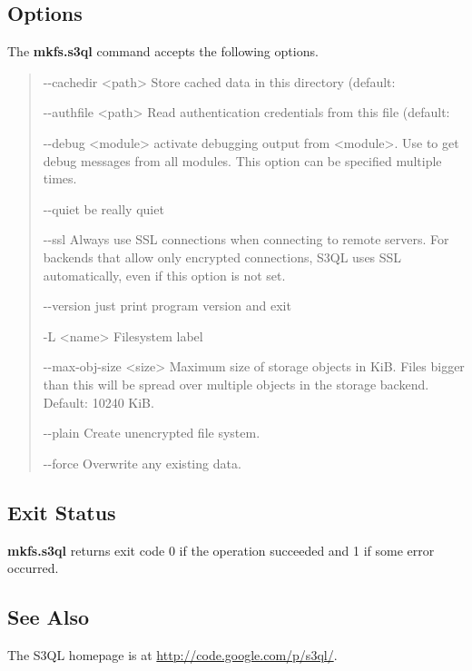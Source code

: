 \documentclass[letterpaper,10pt,english]{sphinxmanual}
\begin{document}
\subsection{Options}
\label{man/mkfs:options}
The \textbf{mkfs.s3ql} command accepts the following options.
\begin{quote}
\begin{optionlist}{3cm}
\item [-{-}cachedir \textless{}path\textgreater{}]  
Store cached data in this directory (default:
\item [-{-}authfile \textless{}path\textgreater{}]  
Read authentication credentials from this file
(default: 
\item [-{-}debug \textless{}module\textgreater{}]  
activate debugging output from \textless{}module\textgreater{}. Use  to
get debug messages from all modules. This option can
be specified multiple times.
\item [-{-}quiet]  
be really quiet
\item [-{-}ssl]  
Always use SSL connections when connecting to remote
servers. For backends that allow only encrypted
connections, S3QL uses SSL automatically, even if this
option is not set.
\item [-{-}version]  
just print program version and exit
\item [-L \textless{}name\textgreater{}]  
Filesystem label
\item [-{-}max-obj-size \textless{}size\textgreater{}]  
Maximum size of storage objects in KiB. Files bigger
than this will be spread over multiple objects in the
storage backend. Default: 10240 KiB.
\item [-{-}plain]  
Create unencrypted file system.
\item [-{-}force]  
Overwrite any existing data.
\end{optionlist}
\end{quote}


\subsection{Exit Status}
\label{man/mkfs:exit-status}
\textbf{mkfs.s3ql} returns exit code 0 if the operation succeeded and 1 if some
error occurred.


\subsection{See Also}
\label{man/mkfs:see-also}
The S3QL homepage is at \href{http://code.google.com/p/s3ql/}{http://code.google.com/p/s3ql/}.
\end{document}
